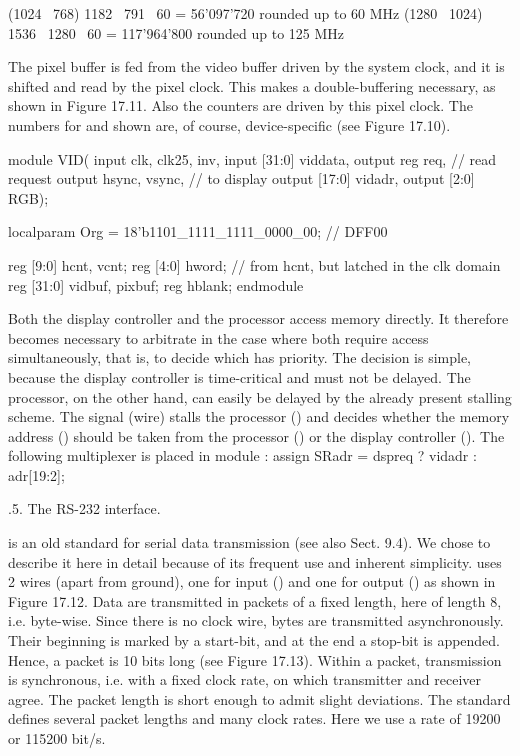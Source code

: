 {(1024 \times\ 768) 1182 \times\ 791 \times\ 60 = 56'097'720 rounded up to 60 MHz (1280 \times\ 1024) 1536 \times\ 1280 \times\ 60 = 117'964'800 rounded up to 125 MHz

The pixel buffer is fed from the video buffer driven by the system clock, and it is shifted and read by the pixel clock. This makes a double-buffering necessary, as shown in Figure 17.11. Also the counters are driven by this pixel clock. The numbers for  and  shown are, of course, device-specific (see Figure 17.10).

\begintt
module VID(
  input clk, clk25, inv,
  input [31:0] viddata,
  output reg req, // read request
  output hsync, vsync, // to display
  output [17:0] vidadr, output [2:0] RGB);
  
  localparam Org = 18'b1101_1111_1111_0000_00; // DFF00
  
  reg [9:0] hcnt, vcnt;
  reg [4:0] hword; // from hcnt, but latched in the clk domain
  reg [31:0] vidbuf, pixbuf;
  reg hblank;
endmodule
\endtt

Both the display controller and the processor access memory directly. It therefore becomes necessary to arbitrate in the case where both require access simultaneously, that is, to decide which has priority. The decision is simple, because the display controller is time-critical and must not be delayed. The processor, on the other hand, can easily be delayed by the already present stalling scheme. The signal (wire)  stalls the processor () and decides whether the memory address () should be taken from the processor () or the display controller (). The following multiplexer is placed in module :
\begintt
assign SRadr = dspreq ? vidadr : adr[19:2];
\endtt

.5. The RS-232 interface.

 is an old standard for serial data transmission (see also Sect. 9.4). We chose to describe it here in detail because of its frequent use and inherent simplicity.  uses 2 wires (apart from ground), one for input () and one for output () as shown in Figure 17.12. Data are transmitted in packets of a fixed length, here of length 8, i.e. byte-wise. Since there is no clock wire, bytes are transmitted asynchronously. Their beginning is marked by a start-bit, and at the end a stop-bit is appended. Hence, a packet is 10 bits long (see Figure 17.13). Within a packet, transmission is synchronous, i.e. with a fixed clock rate, on which transmitter and receiver agree. The packet length is short enough to admit slight deviations. The standard defines several packet lengths and many clock rates. Here we use a rate of 19200 or 115200 bit/s.

}
